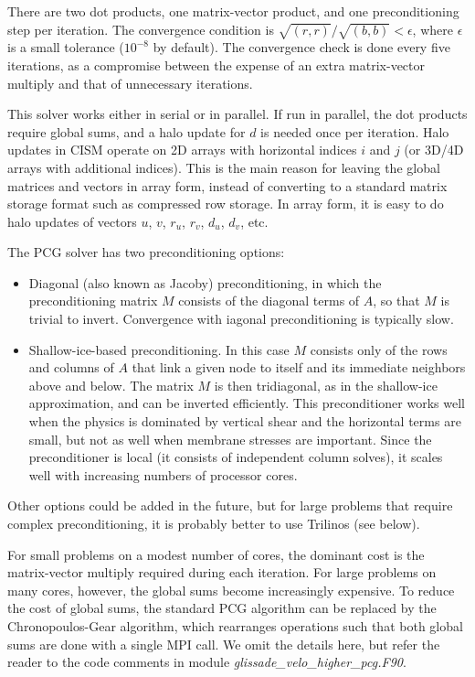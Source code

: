 \noindent
There are two dot products, one matrix-vector product, and one preconditioning step per iteration.
The convergence condition is $\sqrt{(r,r)}/\sqrt{(b,b)} < \epsilon$, where $\epsilon$ is a small tolerance
($10^{-8}$ by default).
The convergence check is done every five iterations, as a compromise
between the expense of an extra matrix-vector multiply and that of unnecessary iterations.

This solver works either in serial or in parallel.  If run in parallel, the dot products
require global sums, and a halo update for $d$ is needed once per iteration.
Halo updates in CISM operate on 2D arrays with horizontal indices $i$ and $j$ (or 3D/4D 
arrays with additional indices).  This is the main reason for
leaving the global matrices and vectors in array form, instead of
converting to a standard matrix storage format such as compressed row storage.
In array form, it is easy to do halo updates of vectors $u$, $v$, $r_u$, $r_v$, $d_u$, $d_v$, etc.

The PCG solver has two preconditioning options:

\begin{itemize}
\item Diagonal (also known as Jacoby) preconditioning, in which the preconditioning matrix $M$ consists
of the diagonal terms of $A$, so that $M$ is trivial to invert.  Convergence with iagonal preconditioning 
is typically slow.
\item Shallow-ice-based preconditioning.  In this case $M$ consists only of the rows and columns of $A$
that link a given node to itself and its immediate neighbors above and below. The matrix $M$ is then
tridiagonal, as in the shallow-ice approximation, and can be inverted efficiently. This preconditioner
works well when the physics is dominated by vertical shear and the horizontal terms are small, but not
as well when membrane stresses are important. Since the preconditioner is local (it consists of
independent column solves), it scales well with increasing numbers of processor cores.
\end{itemize}

\noindent
Other options could be added in the future, but for large problems that require complex preconditioning,
it is probably better to use Trilinos (see below).

For small problems on a modest number of cores, the dominant cost is the matrix-vector
multiply required during each iteration.  For large problems on many cores, however, the global sums become
increasingly expensive.  To reduce the cost of global sums, the standard PCG algorithm can be
replaced by the Chronopoulos-Gear algorithm, which rearranges operations such that both global sums
are done with a single MPI call.  We omit the details here, but refer the reader
to the code comments in module \textit{glissade\_velo\_higher\_pcg.F90}. 

